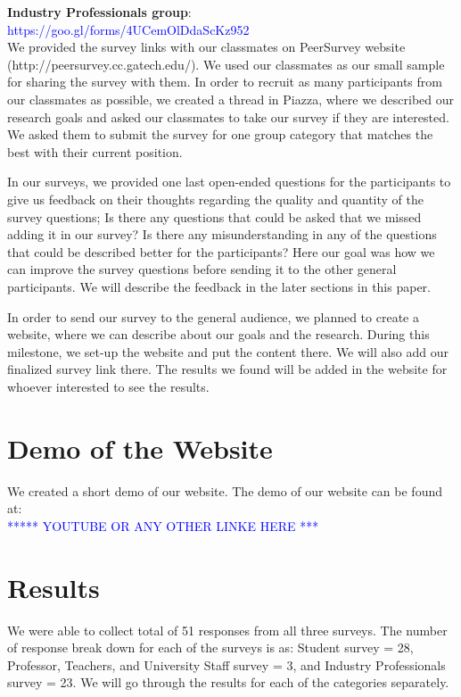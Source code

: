 \documentclass{sigchi}
\begin{document}
\textbf{Industry Professionals group}:\\  \textcolor{blue}{https://goo.gl/forms/4UCemOlDdaScKz952}\\

We provided the survey links with our classmates on PeerSurvey website (http://peersurvey.cc.gatech.edu/). We used our classmates as our small sample for sharing the survey with them. In order to recruit as many participants from our classmates as possible, we created a thread in Piazza, where we described our research goals and asked our classmates to take our survey if they are interested. We asked them to submit the survey for one group category that matches the best with their current position. 

In our surveys, we provided one last open-ended questions for the participants to give us feedback on their thoughts regarding the quality and quantity of the survey questions; Is there any questions that could be asked that we missed adding it in our survey? Is there any misunderstanding in any of the questions that could be described better for the participants? Here our goal was how we can improve the survey questions before sending it to the other general participants. We will describe the feedback in the later sections in this paper.

In order to send our survey to the general audience, we planned to create a website, where we can describe about our goals and the research. During this milestone, we set-up the website and put the content there. We will also add our finalized survey link there. The results we found will be added in the website for whoever interested to see the results. 

\section{Demo of the Website}

We created a short demo of our website. The demo of our website can be found at:\\
\textcolor{blue}{***** YOUTUBE OR ANY OTHER LINKE HERE ***}

\section{Results}

We were able to collect total of 51 responses from all three surveys. The number of response break down for each of the surveys is as: Student survey = 28, Professor, Teachers, and University Staff survey = 3, and Industry Professionals survey = 23.
We will go through the results for each of the categories separately.
\end{document}
